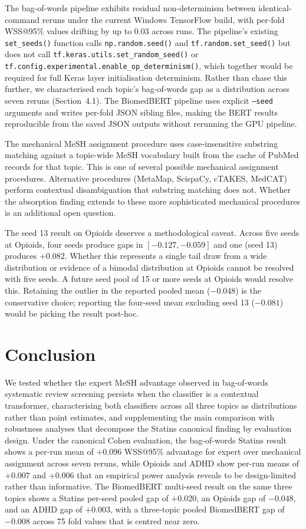 \documentclass[11pt,a4paper]{article}
\begin{document}
The bag-of-words pipeline exhibits residual non-determinism between identical-command reruns under the current Windows TensorFlow build, with per-fold WSS@95\% values drifting by up to 0.03 across runs. The pipeline's existing \texttt{set\_seeds()} function calls \texttt{np.random.seed()} and \texttt{tf.random.set\_seed()} but does not call \texttt{tf.keras.utils.set\_random\_seed()} or \texttt{tf.config.experimental.enable\_op\_determinism()}, which together would be required for full Keras layer initialisation determinism. Rather than chase this further, we characterised each topic's bag-of-words gap as a distribution across seven reruns (Section~4.1). The BiomedBERT pipeline uses explicit \texttt{--seed} arguments and writes per-fold JSON sibling files, making the BERT results reproducible from the saved JSON outputs without rerunning the GPU pipeline.

The mechanical MeSH assignment procedure uses case-insensitive substring matching against a topic-wide MeSH vocabulary built from the cache of PubMed records for that topic. This is one of several possible mechanical assignment procedures. Alternative procedures (MetaMap, ScispaCy, cTAKES, MedCAT) perform contextual disambiguation that substring matching does not. Whether the absorption finding extends to these more sophisticated mechanical procedures is an additional open question.

The seed 13 result on Opioids deserves a methodological caveat. Across five seeds at Opioids, four seeds produce gaps in $[-0.127, -0.059]$ and one (seed 13) produces $+0.082$. Whether this represents a single tail draw from a wide distribution or evidence of a bimodal distribution at Opioids cannot be resolved with five seeds. A future seed pool of 15 or more seeds at Opioids would resolve this. Retaining the outlier in the reported pooled mean ($-0.048$) is the conservative choice; reporting the four-seed mean excluding seed 13 ($-0.081$) would be picking the result post-hoc.

\section{Conclusion}

We tested whether the expert MeSH advantage observed in bag-of-words systematic review screening persists when the classifier is a contextual transformer, characterising both classifiers across all three topics as distributions rather than point estimates, and supplementing the main comparison with robustness analyses that decompose the Statins canonical finding by evaluation design. Under the canonical Cohen evaluation, the bag-of-words Statins result shows a per-run mean of $+0.096$ WSS@95\% advantage for expert over mechanical assignment across seven reruns, while Opioids and ADHD show per-run means of $+0.007$ and $+0.006$ that an empirical power analysis reveals to be design-limited rather than informative. The BiomedBERT multi-seed result on the same three topics shows a Statins per-seed pooled gap of $+0.020$, an Opioids gap of $-0.048$, and an ADHD gap of $+0.003$, with a three-topic pooled BiomedBERT gap of $-0.008$ across 75 fold values that is centred near zero.
\end{document}
